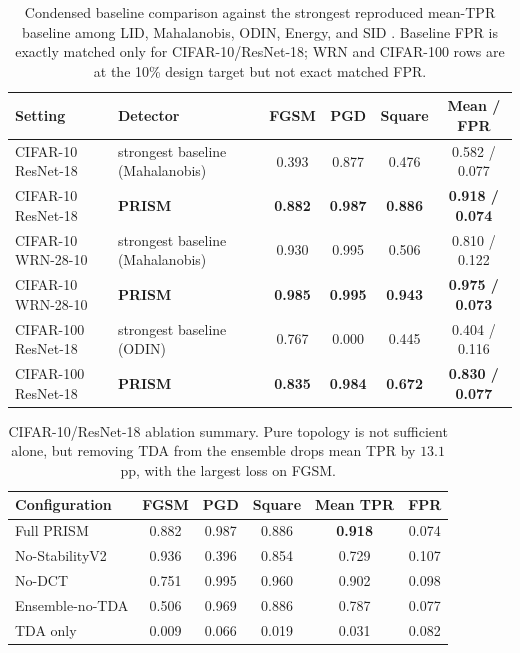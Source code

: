 \documentclass{article}
\newcommand{\prism}{\textsc{PRISM}\xspace}
\begin{document}
\begin{table}[t]
\centering
\small
\setlength{\tabcolsep}{3pt}
\begin{tabular}{@{}llcccc@{}}
\toprule
Setting & Detector & FGSM & PGD & Square & Mean / FPR \\
\midrule
CIFAR-10 ResNet-18 & strongest baseline (Mahalanobis) & 0.393 & 0.877 & 0.476 & 0.582 / 0.077 \\
CIFAR-10 ResNet-18 & \textbf{\prism} & \textbf{0.882} & \textbf{0.987} & \textbf{0.886} & \textbf{0.918 / 0.074} \\
\midrule
CIFAR-10 WRN-28-10 & strongest baseline (Mahalanobis) & 0.930 & 0.995 & 0.506 & 0.810 / 0.122 \\
CIFAR-10 WRN-28-10 & \textbf{\prism} & \textbf{0.985} & \textbf{0.995} & \textbf{0.943} & \textbf{0.975 / 0.073} \\
\midrule
CIFAR-100 ResNet-18 & strongest baseline (ODIN) & 0.767 & 0.000 & 0.445 & 0.404 / 0.116 \\
CIFAR-100 ResNet-18 & \textbf{\prism} & \textbf{0.835} & \textbf{0.984} & \textbf{0.672} & \textbf{0.830 / 0.077} \\
\bottomrule
\end{tabular}
\caption{Condensed baseline comparison against the strongest reproduced mean-TPR baseline among LID, Mahalanobis, ODIN, Energy, and SID \citep{ma2018characterizing,lee2018simple,liang2018enhancing,liu2020energy,tian2021detecting}. Baseline FPR is exactly matched only for CIFAR-10/ResNet-18; WRN and CIFAR-100 rows are at the 10\% design target but not exact matched FPR.}
\label{tab:baselines}
\end{table}

\begin{table}[t]
\centering
\small
\setlength{\tabcolsep}{4pt}
\begin{tabular}{lccccc}
\toprule
Configuration & FGSM & PGD & Square & Mean TPR & FPR \\
\midrule
Full \prism & 0.882 & 0.987 & 0.886 & \textbf{0.918} & 0.074 \\
No-StabilityV2 & 0.936 & 0.396 & 0.854 & 0.729 & 0.107 \\
No-DCT & 0.751 & 0.995 & 0.960 & 0.902 & 0.098 \\
Ensemble-no-TDA & 0.506 & 0.969 & 0.886 & 0.787 & 0.077 \\
TDA only & 0.009 & 0.066 & 0.019 & 0.031 & 0.082 \\
\bottomrule
\end{tabular}
\caption{CIFAR-10/ResNet-18 ablation summary. Pure topology is not sufficient alone, but removing TDA from the ensemble drops mean TPR by $13.1$ pp, with the largest loss on FGSM.}
\label{tab:ablation}
\end{table}
\end{document}
